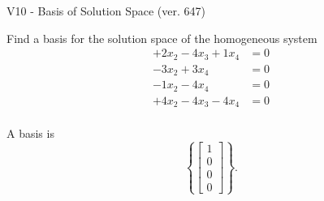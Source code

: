 \begin{exercise}
  \begin{exerciseTitle}V10 - Basis of Solution Space (ver. 647)\end{exerciseTitle}
  \begin{exerciseStatement}
    Find a basis for the solution space of the homogeneous system 
\begin{align*}
 + 2 x_ 2 -4 x_ 3 + 1 x_ 4 &= 0  \\ 
  -3 x_ 2 + 3 x_ 4 &= 0  \\ 
  -1 x_ 2 -4 x_ 4 &= 0  \\ 
  + 4 x_ 2 -4 x_ 3 -4 x_ 4 &= 0  \\ 
 \end{align*}


 
  \end{exerciseStatement}

  \begin{exerciseAnswer}
   A basis is   
\[\left\{\left[\begin{array}{c}
1 \\
0 \\
0 \\
0
\end{array}\right]\right\}.\]

  


  \end{exerciseAnswer}
\end{exercise}